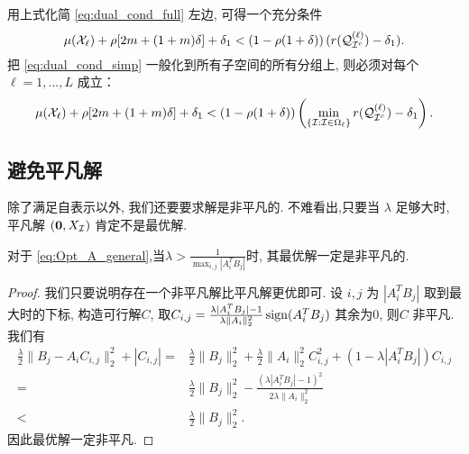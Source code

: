 用上式化简 \eqref{eq:dual_cond_full} 左边, 可得一个充分条件
\begin{equation}\label{eq:dual_cond_simp}
  \mu(\mathcal{X}_{\ell}) +\rho [2m+(1+m)\delta] +\delta_1
  < \left(1-\rho(1+\delta)\right)(r(\mathcal{Q}_{\mathcal{I}^c}^{(\ell)})-\delta_1).
\end{equation}
把 \eqref{eq:dual_cond_simp} 一般化到所有子空间的所有分组上,
则必须对每个\(\ell = 1,...,L\) 成立：
\begin{equation}\label{eq:Thm1_all}
  \mu(\mathcal{X}_{\ell}) +\rho [2m+(1+m)\delta] +\delta_1
  < \left(1-\rho(1+\delta)\right)\left(\min_{\{\mathcal{I}: \mathcal{I}\in \Omega_\ell\}}r(\mathcal{Q}^{(\ell)}_{\mathcal{I}^c})-\delta_1\right).
\end{equation}

\subsection{避免平凡解}\label{sec:avoid_trivial}
除了满足自表示以外, 我们还要要求解是非平凡的. 不难看出,只要当 \(\lambda\)
足够大时, 平凡解 \((\mathbf{0}, X_{\mathcal{I}})\) 肯定不是最优解.

\begin{lemma}\label{lemma:avoid_trivial}
  对于 \eqref{eq:Opt_A_general},当\(\lambda > \frac{1}{\max_{i,j} |A_i^T B_j|}\)时,
  其最优解一定是非平凡的.
\end{lemma}
\begin{proof}
  我们只要说明存在一个非平凡解比平凡解更优即可. 设 \(i, j\) 为 \(|A_i^T
  B_j|\) 取到最大时的下标, 构造可行解\(C\), 
  取\(C_{i,j} = \frac{\lambda |A_i^T B_j|-1}{\lambda \|A_i\|_2^2} \operatorname{sign}(A_i^T B_j)\) 
  其余为\(0\), 则\(C\) 非平凡.我们有
  \begin{align*}
    \frac{\lambda}{2} \|B_j - A_i C_{i, j} \|_2^2 + |C_{i, j}| =& \frac{\lambda}{2}
    \|B_j\|_2^2 + \frac{\lambda}{2} \|A_i\|_2^2 C_{i,j}^2 +\left( 1-\lambda |A_i^T B_j|
    \right)C_{i,j} \\
    =&\frac{\lambda}{2} \|B_j\|_2^2 - \frac{(\lambda|A_i^T B_j| -1)^2}
    {2 \lambda \|A_i\|_2^2 }\\
    <& \frac{\lambda}{2} \|B_j\|_2^2. 
  \end{align*}
  因此最优解一定非平凡.
\end{proof}


